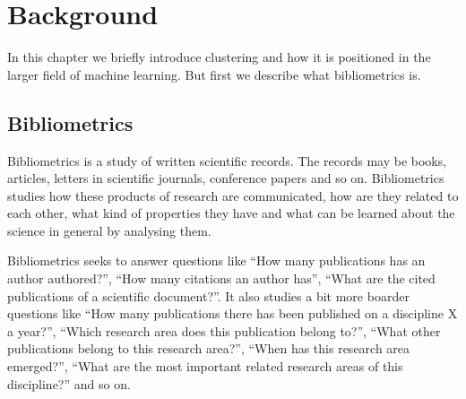 \chapter{Background}
\label{chapter:background}

% 


In this chapter we briefly introduce clustering and how it is 
positioned in the larger field of machine learning. But first we
describe what bibliometrics is.

\section{Bibliometrics}
\label{sec:bibliometrics}
Bibliometrics is a study of written scientific records. The 
records may be books, articles, letters in scientific journals, 
conference papers and so on. Bibliometrics studies how these 
products of research are communicated, how are they related to 
each other, what kind of properties they have and what can be 
learned about the science in general by analysing them.

Bibliometrics seeks to answer questions like ``How many 
publications has an author authored?'', ``How many citations an 
author has'', ``What are the 
cited publications of a scientific document?''. It also studies
a bit more boarder questions like ``How many publications there 
has been published on a discipline X a year?'', ``Which research area
does this publication belong to?'', ``What other publications 
belong to this research area?'', ``When has this research area
emerged?'', ``What are the most important related research areas
of this discipline?'' and so on.

